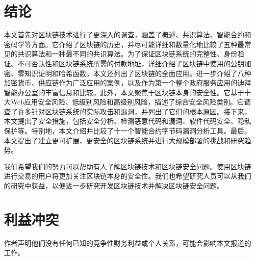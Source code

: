 \begin{translation}
\section{结论}
本文首先对区块链技术进行了更深入的调查，涵盖了概述、共识算法、智能合约和密码学等方面。它介绍了区块链的历史，并尽可能详细和数量化地比较了五种最常见的共识算法和一种最不同的共识算法。为了保证区块链系统的完整性、身份验证、不可否认性和区块链系统所需的付款地址，详细介绍了区块链中使用的公钥加密、零知识证明和哈希函数。本文还列出了区块链的全面应用。进一步介绍了八种加密货币、供应链作为广泛应用的案例，以及作为第一个整个政府服务应用的迪拜智能办公室的丰富信息和比较。此外，本文聚焦于区块链本身的安全性。它基于十大Web应用安全风险、低级别风险和高级别风险，描述了综合安全风险类别。它调查了许多针对区块链系统的实际攻击和漏洞，并列出了它们的根本原因。接下来，本文提出了安全措施，包括安全分析、检测恶意代码和漏洞、软件代码安全、隐私保护等。特别地，本文介绍并比较了十一个智能合约字节码漏洞分析工具。最后，本文提出了建立更可扩展、更安全的区块链系统并进行大规模部署的挑战和研究趋势。

我们希望我们的努力可以帮助有人了解区块链技术和区块链安全问题。使用区块链进行交易的用户将更加关注区块链本身的安全性。我们也希望研究人员可以从我们的研究中获益，以便进一步研究开发区块链技术并解决区块链安全问题。

\section{利益冲突}
作者声明他们没有任何已知的竞争性财务利益或个人关系，可能会影响本文报道的工作。

\appendix




\begin{translation-index}
  \nocite{GUO2022100067}
  
  
\end{translation-index}

\end{translation}
